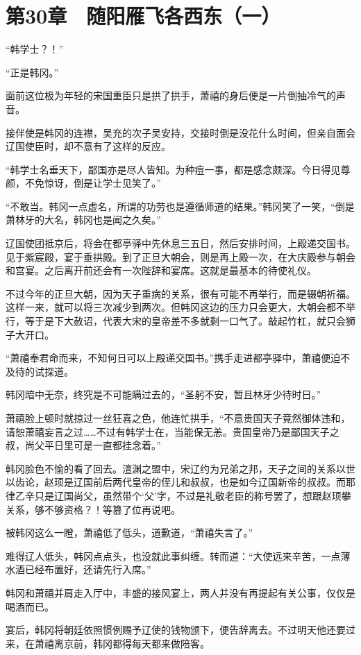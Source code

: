 \section{第30章　随阳雁飞各西东（一）}

“韩学士？！” 

“正是韩冈。” 

面前这位极为年轻的宋国重臣只是拱了拱手，萧禧的身后便是一片倒抽冷气的声音。 

接伴使是韩冈的连襟，吴充的次子吴安持，交接时倒是没花什么时间，但亲自面会辽国使臣时，却不意有了这样的反应。 

“韩学士名垂天下，鄙国亦是尽人皆知。为种痘一事，都是感念颇深。今日得见尊颜，不免惊讶，倒是让学士见笑了。” 

“不敢当。韩冈一点虚名，所谓的功劳也是遵循师道的结果。”韩冈笑了一笑，“倒是萧林牙的大名，韩冈也是闻之久矣。” 

辽国使团抵京后，将会在都亭驿中先休息三五日，然后安排时间，上殿递交国书。见于紫宸殿，宴于垂拱殿。到了正旦大朝会，则是再上殿一次，在大庆殿参与朝会和宫宴。之后离开前还会有一次陛辞和宴席。这就是最基本的待使礼仪。 

不过今年的正旦大朝，因为天子重病的关系，很有可能不再举行，而是辍朝祈福。这样一来，就可以将三次减少到两次。但韩冈这边的压力只会更大，大朝会都不举行，等于是下大赦诏，代表大宋的皇帝差不多就剩一口气了。敲起竹杠，就只会狮子大开口。 

“萧禧奉君命而来，不知何日可以上殿递交国书。”携手走进都亭驿中，萧禧便迫不及待的试探道。 

韩冈暗中无奈，终究是不可能瞒过去的，“圣躬不安，暂且林牙少待时日。” 

萧禧脸上顿时就掠过一丝狂喜之色，他连忙拱手，“不意贵国天子竟然御体违和，请恕萧禧妄言之过……不过有韩学士在，当能保无恙。贵国皇帝乃是鄙国天子之叔，尚父平日里可是一直都挂念着。” 

韩冈脸色不愉的看了回去。澶渊之盟中，宋辽约为兄弟之邦，天子之间的关系以世以齿论，赵顼是辽国前后两代皇帝的侄儿和叔叔，也是如今辽国新帝的叔叔。而耶律乙辛只是辽国尚父，虽然带个‘父’字，不过是礼敬老臣的称号罢了，想跟赵顼攀关系，够不够资格？！等篡了位再说吧。 

被韩冈这么一瞪，萧禧低了低头，道歉道，“萧禧失言了。” 

难得辽人低头，韩冈点点头，也没就此事纠缠。转而道：“大使远来辛苦，一点薄水酒已经布置好，还请先行入席。” 

韩冈和萧禧并肩走入厅中，丰盛的接风宴上，两人并没有再提起有关公事，仅仅是喝酒而已。 

宴后，韩冈将朝廷依照惯例赐予辽使的钱物颁下，便告辞离去。不过明天他还要过来，在萧禧离京前，韩冈都得每天都来做陪客。 

